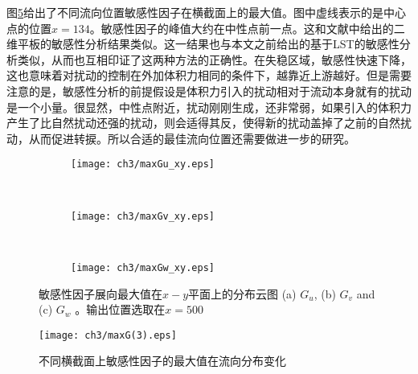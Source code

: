 图\ref{f:maxsen}给出了不同流向位置敏感性因子在横截面上的最大值。图中虚线表示的是中心点的位置$x=134$。敏感性因子的峰值大约在中性点前一点。这和文献\cite{pralits2000sensitivity}中给出的二维平板的敏感性分析结果类似。这一结果也与本文之前给出的基于LST的敏感性分析类似，从而也互相印证了这两种方法的正确性。在失稳区域，敏感性快速下降，这也意味着对扰动的控制在外加体积力相同的条件下，越靠近上游越好。但是需要注意的是，敏感性分析的前提假设是体积力引入的扰动相对于流动本身就有的扰动是一个小量。很显然，中性点附近，扰动刚刚生成，还非常弱，如果引入的体积力产生了比自然扰动还强的扰动，则会适得其反，使得新的扰动盖掉了之前的自然扰动，从而促进转捩。所以合适的最佳流向位置还需要做进一步的研究。
\begin{figure}[H]
  \centering
  \begin{subfigure}{\textwidth}
  \texttt{[image: ch3/maxGu\_xy.eps]}
  \caption{\label{f:Gu_xy}}
  \end{subfigure}\\
  \bigskip
  \begin{subfigure}{\textwidth}
  \texttt{[image: ch3/maxGv\_xy.eps]}
  \caption{\label{f:Gv_xy}}
  \end{subfigure}\\
  \bigskip
  \begin{subfigure}{\textwidth}
  \texttt{[image: ch3/maxGw\_xy.eps]}
  \caption{\label{f:Gw_xy}}
  \end{subfigure}
  \caption{敏感性因子展向最大值在$x-y$平面上的分布云图 (a) $G_u$, (b) $G_v$ and (c) $G_w$ 。输出位置选取在$x=500$}\label{f:Guvw_xy}
\end{figure}
\begin{figure}[htb]
  \centering
  \texttt{[image: ch3/maxG(3).eps]}\\
  \caption{不同横截面上敏感性因子的最大值在流向分布变化}\label{f:maxsen}
\end{figure}

